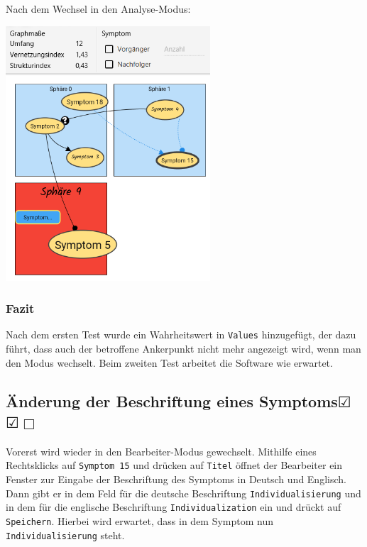 \documentclass[enabledeprecatedfontcommands]{scrartcl}
\newcommand{\subsectiont}[2]{\subsection[#1]{#1{\normalsize\normalfont #2}}}
\newcommand{\leer}{$\Box$}
\newcommand{\ok}{$\CheckedBox$}
\begin{document}
Nach dem Wechsel in den Analyse-Modus:
\begin{center}
\includegraphics[height=9.5cm]{3_45nachher.png}
\end{center}
\subsubsection{Fazit}
Nach dem ersten Test wurde ein Wahrheitswert in \texttt{Values} hinzugefügt, der dazu führt, dass auch der betroffene Ankerpunkt nicht mehr angezeigt wird, wenn man den Modus wechselt. Beim zweiten Test arbeitet die Software wie erwartet.

\subsectiont{Änderung der Beschriftung eines Symptoms}{\dotfill\ok\ok\leer}
Vorerst wird wieder in den Bearbeiter-Modus gewechselt. Mithilfe eines Rechtsklicks auf \texttt{Symptom 15} und drücken auf \texttt{Titel} öffnet der Bearbeiter ein Fenster zur Eingabe der Beschriftung des Symptoms in Deutsch und Englisch. Dann gibt er in dem Feld für die deutsche Beschriftung \texttt{Individualisierung}  und in dem für die englische Beschriftung \texttt{Individualization} ein und drückt auf \texttt{Speichern}. Hierbei wird erwartet, dass in dem Symptom nun \texttt{Individualisierung} steht. 
\end{document}
